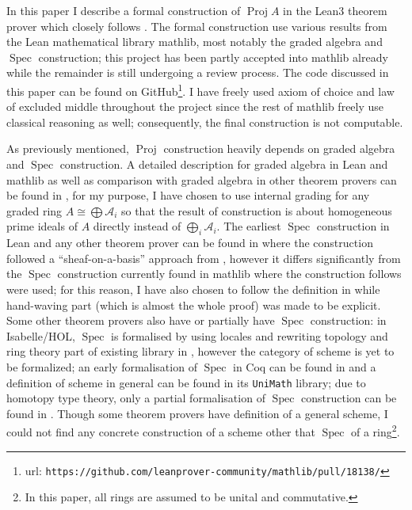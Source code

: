 \documentclass[a4paper,UKenglish,cleveref, autoref, thm-restate]{lipics-v2021}
\begin{document}
In this paper I describe a formal construction of $\operatorname{Proj} A$ in the Lean3 \cite{de2015lean} theorem prover which closely follows \cite[Chapter~II]{hartshorne1977graduate}. The formal construction use various results from the Lean mathematical library \textsf{mathlib}, most notably the graded algebra and $\operatorname{Spec}$ construction; this project has been partly accepted into \textsf{mathlib} already while the remainder is still undergoing a review process. The code discussed in this paper can be found on GitHub\footnote{url: \texttt{https://github.com/leanprover-community/mathlib/pull/18138/}}.  I have freely used axiom of choice and law of excluded middle throughout the project since the rest of \textsf{mathlib} freely use classical reasoning as well; consequently, the final construction is not computable.

As previously mentioned, $\operatorname{Proj}$ construction heavily depends on graded algebra and $\operatorname{Spec}$ construction. A detailed description for graded algebra in Lean  and \textsf{mathlib} as well as comparison with graded algebra in other theorem provers can be found in \cite{wieser2022graded}, for my purpose, I have chosen to use internal grading for any graded ring $A \cong \bigoplus \mathcal{A}_i$ so that the result of construction is about homogeneous prime ideals of $A$ directly instead of $\bigoplus_i \mathcal{A}_i$. The earliest $\operatorname{Spec}$ construction in Lean and any other theorem prover can be found in \cite{buzzard2022schemes} where the construction followed a ``sheaf-on-a-basis'' approach from \cite[\href{https://stacks.math.columbia.edu/tag/01HR}{Section 01HR}]{stacks-project}, however it differs significantly from the $\operatorname{Spec}$ construction currently found in \textsf{mathlib} where the construction follows \cite[Chapter~II]{hartshorne1977graduate} were used; for this reason, I have also chosen to follow the definition in \cite[Chapter~II]{hartshorne1977graduate} while hand-waving part (which is almost the whole proof) was made to be explicit. Some other theorem provers also have or partially have $\operatorname{Spec}$ construction: in Isabelle/HOL, $\operatorname{Spec}$ is formalised by using locales and rewriting topology and ring theory part of existing library in \cite{doi:10.1080/10586458.2022.2062073}, however the category of scheme is yet to be formalized; an early formalisation of $\operatorname{Spec}$ in Coq can be found in \cite{chicli2001formalisation} and a definition of scheme in general can be found in its \texttt{UniMath} library; due to homotopy type theory, only a partial formalisation of $\operatorname{Spec}$ construction can be found in \cite{mortbergtowards}. Though some theorem provers have definition of a general scheme, I could not find any concrete construction of a scheme other that $\operatorname{Spec}$ of a ring\footnote{In this paper, all rings are assumed to be unital and commutative.}.
\end{document}
